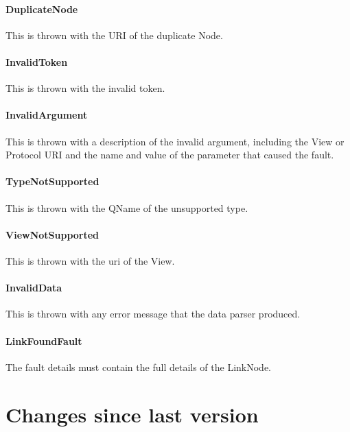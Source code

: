 \documentclass[11pt,a4paper]{ivoa}
\begin{document}
\paragraph{DuplicateNode}
This is thrown with the URI of the duplicate Node.

\paragraph{InvalidToken}
This is thrown with the invalid token.

\paragraph{InvalidArgument}
This is thrown with a description of the invalid argument, including the View or Protocol URI and the name and value of the parameter that caused the fault.

\paragraph{TypeNotSupported}
This is thrown with the QName of the unsupported type.

\paragraph{ViewNotSupported}
This is thrown with the uri of the View.

\paragraph{InvalidData}
This is thrown with any error message that the data parser produced.

\paragraph{LinkFoundFault}
The fault details must contain the full details of the LinkNode.

\section{Changes since last version}
\label{sec:changes since last version}
\end{document}
